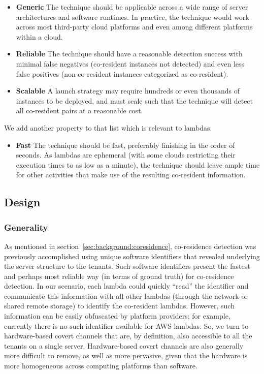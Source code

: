 \begin{itemize}
    \item \textbf{Generic} The technique should be applicable across a wide
    range of server architectures and software runtimes. In practice, the
    technique would work across most third-party cloud platforms and even 
    among different platforms within a cloud.
    \item \textbf{Reliable} The technique should have a reasonable detection success
    with minimal false negatives (co-resident instances not detected) and even 
    less false positives (non-co-resident instances categorized as co-resident).
    \item \textbf{Scalable} A launch strategy may require hundreds or even
    thousands of instances to be deployed, and must scale such that the
    technique will detect all co-resident pairs at a reasonable cost.
\end{itemize}

\noindent We add another property to that list which is relevant to lambdas:
\begin{itemize}
    \item \textbf{Fast} The technique should be fast, preferably finishing in 
    the order of seconds. As lambdas are ephemeral (with some clouds restricting their 
    execution times to as low as a minute), the technique should leave ample time 
    for other activities that make use of the resulting co-resident information.
\end{itemize}


\subsection{Design}

\subsubsection{Generality}
As mentioned in section~\ref{sec:background:coresidence}, co-residence detection
was previously accomplished using unique software identifiers that revealed
underlying the server structure to the tenants. Such software identifiers
present the fastest and perhaps most reliable way (in terms of ground
truth) for co-residence detection. 
In our scenario, each lambda could quickly ``read'' the identifier
and communicate this information with all other lambdas (through the network or
shared remote storage) to identify the co-resident lambdas. However, such
information can be easily obfuscated by platform providers; for example,
currently there is no such identifier available for AWS lambdas.  So, we turn to
hardware-based covert channels that are, by definition, also accessible to all
the tenants on a single server. Hardware-based covert channels are also
generally more difficult to remove, as well as more pervasive,
given that the hardware is more homogeneous across computing platforms
than software. 


